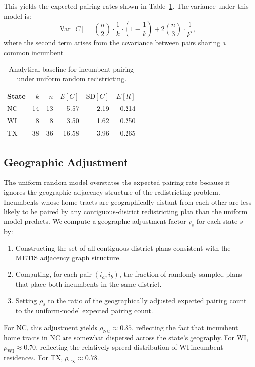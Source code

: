 This yields the expected pairing rates shown in Table~\ref{tab:baseline}. The variance
under this model is:
\[
  \text{Var}[C] = \binom{n}{2} \cdot \frac{1}{k} \cdot \left(1 - \frac{1}{k}\right)
  + 2\binom{n}{3} \cdot \frac{1}{k^2},
\]
where the second term arises from the covariance between pairs sharing a common incumbent.

\begin{table}[ht]
\centering
\caption{Analytical baseline for incumbent pairing under uniform random redistricting.}
\label{tab:baseline}
\begin{tabular}{l r r r r r}
\toprule
State & $k$ & $n$ & $E[C]$ & $\text{SD}[C]$ & $E[R]$ \\
\midrule
NC & 14 & 13 & 5.57 & 2.19 & 0.214 \\
WI & 8  & 8  & 3.50 & 1.62 & 0.250 \\
TX & 38 & 36 & 16.58 & 3.96 & 0.265 \\
\bottomrule
\end{tabular}
\end{table}

\subsection{Geographic Adjustment}

The uniform random model overstates the expected pairing rate because it ignores the
geographic adjacency structure of the redistricting problem. Incumbents whose home
tracts are geographically distant from each other are less likely to be paired by any
contiguous-district redistricting plan than the uniform model predicts. We compute a
geographic adjustment factor $\rho_s$ for each state $s$ by:

\begin{enumerate}
  \item Constructing the set of all contiguous-district plans consistent with the
    METIS adjacency graph structure.
  \item Computing, for each pair $(i_a, i_b)$, the fraction of randomly sampled plans
    that place both incumbents in the same district.
  \item Setting $\rho_s$ to the ratio of the geographically adjusted expected pairing
    count to the uniform-model expected pairing count.
\end{enumerate}

For NC, this adjustment yields $\rho_{\text{NC}} \approx 0.85$, reflecting the fact
that incumbent home tracts in NC are somewhat dispersed across the state's geography.
For WI, $\rho_{\text{WI}} \approx 0.70$, reflecting the relatively spread distribution
of WI incumbent residences. For TX, $\rho_{\text{TX}} \approx 0.78$.

